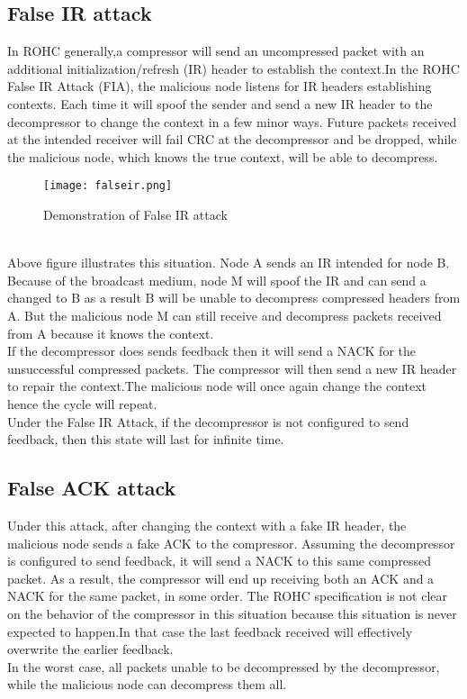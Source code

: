 \documentclass[a4paper,11pt]{article}
\begin{document}
\subsection{False IR attack} 
In ROHC generally,a compressor will send an uncompressed packet with an additional initialization/refresh (IR) header to establish the context.In the ROHC False IR Attack (FIA), the malicious node listens for IR headers establishing contexts. Each time  it will spoof the sender and send a new IR header to the decompressor to change the context in a few minor ways. Future packets received at the intended receiver will fail CRC at the decompressor and be dropped, while the malicious node, which knows the true context, will be able to decompress.\\
\begin{figure}[h]
\centering
\texttt{[image: falseir.png]}
\caption{Demonstration of False IR attack}
\label{fig:falseir}
\end{figure}
\\
Above figure  illustrates this situation. Node A sends an IR intended for node B. Because of the broadcast medium, node M will spoof the IR and can send a changed to B as a result B will be unable to decompress compressed headers from A. But the malicious node M can still receive and decompress packets received from A  because it knows the context.\\
If the decompressor does sends feedback then it will send a NACK for the unsuccessful compressed packets. The compressor will then send a new IR header to repair the context.The malicious node will once again change the context hence the cycle will  repeat.\\
Under the False IR Attack, if the decompressor is not configured to send feedback, then this state will last for infinite time.
\subsection{False ACK attack}
Under this attack, after changing the context with a fake IR header, the malicious node sends a fake ACK to the compressor. Assuming the decompressor is configured to send feedback, it will send a NACK to this same compressed packet. As a result, the compressor will end up receiving both an ACK and a NACK for the same packet, in some order. The ROHC specification is not clear on the behavior of the compressor in this situation because this situation is never expected to happen.In that case the last feedback received will effectively overwrite the earlier feedback.\\
In the worst case, all packets unable to be decompressed by the decompressor, while the malicious
node can decompress them all. 
\end{document}
